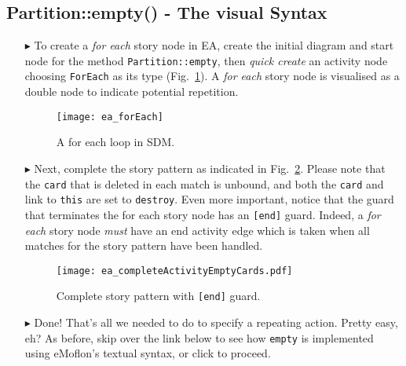 \newpage
\subsection{Partition::empty() - The visual Syntax}
\visHeader
\hypertarget{emptyPartition vis}{}

\begin{itemize}
\vspace{0.5cm}

\item[$\blacktriangleright$] To create a \emph{for each} story node in EA, create the initial diagram and start node for the method \texttt{Partition::empty},
then \emph{quick create} an activity node choosing \texttt{ForEach} as its type (Fig.~\ref{fig:sdm_foreach}). A \emph{for each} story node is visualised as a
double node to indicate potential repetition.

\vspace{1cm}

\begin{figure}[htbp]
\begin{center}
  \texttt{[image: ea\_forEach]}
  \caption{A for each loop in SDM.}  
  \label{fig:sdm_foreach}
\end{center}
\end{figure}

\vspace{1cm}

\item[$\blacktriangleright$] Next, complete the story pattern as indicated in Fig.~\ref{fig:sdm_end}. Please note that the \texttt{card} that is deleted in each match
is unbound, and both the \texttt{card} and link to \texttt{this} are set to \texttt{destroy}. Even more important, notice that the guard that terminates the for
each story node has an \texttt{[end]} guard. Indeed, a \emph{for each} story node \emph{must} have an end activity edge which is taken when all matches for the
story pattern have been handled.

\pagebreak

\begin{figure}[htbp]
\begin{center}
  \texttt{[image: ea\_completeActivityEmptyCards.pdf]}
  \caption{Complete story pattern with \texttt{[end]} guard.}  
  \label{fig:sdm_end}
\end{center}
\end{figure}

 \item[$\blacktriangleright$] Done! That's all we needed to do to specify a repeating
action. Pretty easy, eh? As before, skip over the link below to see how \texttt{empty} is implemented using eMoflon's textual syntax, or click to proceed.

\end{itemize}

